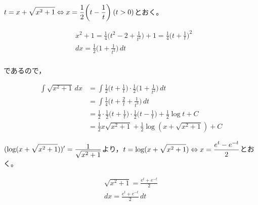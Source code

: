 \documentclass[a4paper]{ltjsarticle}
\begin{document}
\begin{intprob}
  \begin{other*}[1]
    $\displaystyle t = x + \sqrt{x^2 + 1}\Leftrightarrow x = \frac{1}{2}\biggl(t-\frac{1}{t}\biggr)\:(t>0)$とおく。
    \begin{fleqn}[20pt]
      \begin{align*}
        &x^2 + 1 = \frac{1}{4}\biggl(t^2 - 2 + \frac{1}{t^2}\biggr) + 1 = \frac{1}{4}\biggl(t+\frac{1}{t}\biggr)^2 \\
        &dx = \frac{1}{2}\biggl(1+\frac{1}{t^2}\biggr)\,dt \\
      \end{align*}
    \end{fleqn}
    であるので，
    \begin{fleqn}[20pt]
      \begin{align*}
        \int \sqrt{x^2 + 1}\,dx
        &= \int \frac{1}{2}\biggl(t+\frac{1}{t}\biggr)\cdot \frac{1}{2}\biggl(1+\frac{1}{t^2}\biggr)\,dt \\
        &= \int \frac{1}{4}\biggl(t+\frac{2}{t}+\frac{1}{t^3}\biggr)\,dt \\
        &= \frac{1}{2}\cdot\frac{1}{2}\biggl(t+\frac{1}{t}\biggr)\cdot\frac{1}{2}\biggl(t-\frac{1}{t}\biggr)+\frac{1}{2}\log t + C \\
        &= \frac{1}{2}x\sqrt{x^2+1} + \frac{1}{2}\log(x+\sqrt{x^2+1}) + C
      \end{align*}
    \end{fleqn}
  \end{other*}

  \begin{other*}[2]
  $\disp (\log(x+\sqrt{x^2+1}))'=\frac{\raisebox{-3pt}{1}}{\sqrt{x^2 + 1}}$より，$\displaystyle t=\log(x+\sqrt{x^2+1})\Leftrightarrow x = \frac{e^t-e^{-t}}{2}$とおく。
  \begin{fleqn}[20pt]
    \begin{align*}
      \sqrt{x^2 + 1} = \frac{e^t+e^{-t}}{2} \\
      dx = \frac{e^t+e^{-t}}{2}\,dt
    \end{align*}
  \end{fleqn}


\end{other*}
\end{intprob}
\end{document}
